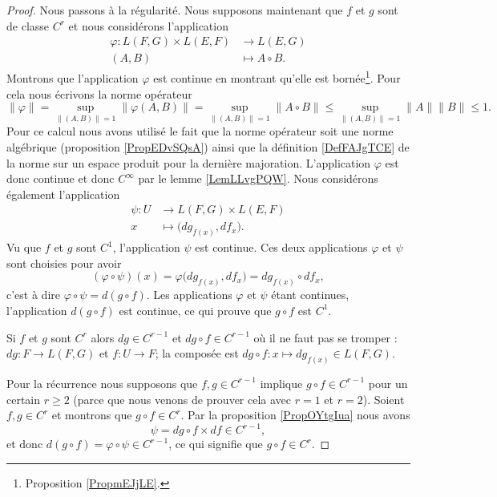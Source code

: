 \begin{proof}
    Nous passons à la régularité. Nous supposons maintenant que \( f\) et \( g\) sont de classe \( C^r\) et nous considérons l'application
    \begin{equation}
        \begin{aligned}
            \varphi\colon L(F,G)\times L(E,F)&\to L(E,G) \\
            (A,B)&\mapsto A\circ B. 
        \end{aligned}
    \end{equation}
    Montrons que l'application \( \varphi\) est continue en montrant qu'elle est bornée\footnote{Proposition \ref{PropmEJjLE}.}. Pour cela nous écrivons la norme opérateur
    \begin{equation}
        \| \varphi \|=\sup_{\| (A,B) \|=1}\| \varphi(A,B) \|=\sup_{\| (A,B) \|=1}\| A\circ B \|\leq\sup_{\| (A,B) \|=1}\| A \|\| B \|\leq 1.
    \end{equation}
    Pour ce calcul nous avons utilisé le fait que la norme opérateur soit une norme algébrique (proposition \ref{PropEDvSQsA}) ainsi que la définition \ref{DefFAJgTCE} de la norme sur un espace produit pour la dernière majoration. L'application \( \varphi\) est donc continue et donc \(  C^{\infty}\) par le lemme \ref{LemLLvgPQW}. Nous considérons également l'application
    \begin{equation}
        \begin{aligned}
        \psi\colon U&\to L(F,G)\times L(E,F) \\
        x&\mapsto \big( dg_{f(x)},df_x \big). 
        \end{aligned}
    \end{equation}
    Vu que \( f\) et \( g\) sont \( C^1\), l'application \( \psi\) est continue. Ces deux applications \( \varphi\) et \( \psi\) sont choisies pour avoir
    \begin{equation}
        (\varphi\circ\psi)(x)=\varphi\big( dg_{f(x)},df_x \big)=dg_{f(x)}\circ df_x,
    \end{equation}
    c'est à dire \( \varphi\circ\psi=d(g\circ f)\). Les applications \( \varphi\) et \( \psi\) étant continues, l'application \( d(g\circ f)\) est continue, ce qui prouve que \( g\circ f\) est \( C^1\).

    Si \( f\) et \( g\) sont \( C^r\) alors \( dg\in C^{r-1}\) et \( dg\circ f\in C^{r-1}\) où il ne faut pas se tromper : \( dg\colon F\to L(F,G)\) et \( f\colon U\to F\); la composée est \( dg\circ f\colon x\mapsto dg_{f(x)}\in L(F,G)\). 
    
    Pour la récurrence nous supposons que \( f,g\in C^{r-1}\) implique \( g\circ f\in C^{r-1}\) pour un certain \( r\geq 2\) (parce que nous venons de prouver cela avec \( r=1\) et \( r=2\)). Soient \( f,g\in C^r\) et montrons que \( g\circ f\in C^r\). Par la proposition \ref{PropOYtgIua} nous avons
    \begin{equation}
        \psi=dg\circ f\times df\in C^{r-1},
    \end{equation}
    et donc \( d(g\circ f)=\varphi\circ\psi\in C^{r-1}\), ce qui signifie que \( g\circ f\in C^r\).
\end{proof}

